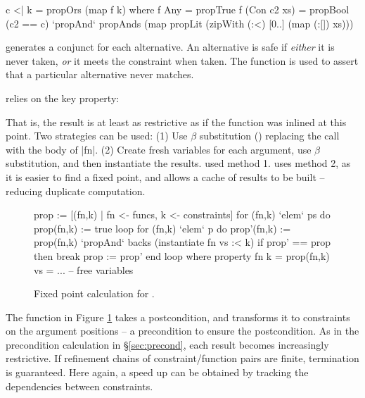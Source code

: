 \begin{code}
c <| k = propOrs (map f k)
    where
    f Any = propTrue
    f (Con c2 xs) = propBool (c2 == c) `propAnd`
        propAnds (map propLit (zipWith (:<) [0..] (map (:[]) xs)))
\end{code}

 generates a conjunct for each alternative. An alternative is safe if \textit{either} it is never taken, \textit{or} it meets the constraint when taken. The  function is used to assert that a particular alternative never matches.

 relies on the key property:


That is, the result is at least as restrictive as if the function was inlined at this point. Two strategies can be used: (1) Use $\beta$ substitution () replacing the call with the body of |fn|. (2) Create fresh variables for each argument, use $\beta$ substitution, and then instantiate the results. \oldtool{} used method 1. \newtool{} uses method 2, as it is easier to find a fixed point, and allows a cache of results to be built -- reducing duplicate computation.

\begin{figure}
\ignore\begin{code}
prop := [(fn,k) | fn <- funcs, k <- constraints]
for (fn,k) `elem` ps do prop(fn,k) := true
loop
    for (fn,k) `elem` p do
        prop'(fn,k) := prop(fn,k) `propAnd` backs (instantiate fn vs :< k)
    if prop' == prop then break
    prop := prop'
end loop
    where
        property fn k = prop(fn,k)
        vs = ... -- free variables
\end{code}
\caption{Fixed point calculation for .}
\label{fig:property_fixp}
\figureend
\end{figure}

The function  in Figure \ref{fig:property_fixp} takes a postcondition, and transforms it to constraints on the argument positions -- a precondition to ensure the postcondition. As in the precondition calculation in \S\ref{sec:precond}, each result becomes increasingly restrictive. If refinement chains of constraint/function pairs are finite, termination is guaranteed. Here again, a speed up can be obtained by tracking the dependencies between constraints.

